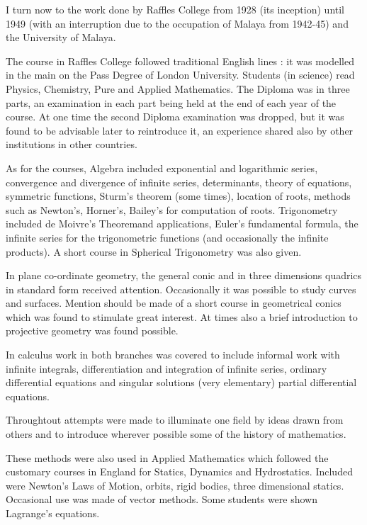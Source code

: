 I turn now to the work done by Raffles College from 1928 (its inception) until 1949 (with an interruption due to the occupation of Malaya from 1942-45) and the University of Malaya.

The course in Raffles College followed traditional English lines : it was modelled in the main on the Pass Degree of London University. Students (in science) read Physics, Chemistry, Pure and Applied Mathematics. The Diploma was in three parts, an examination in each part being held at the end of each year of the course. At one time the second Diploma examination was dropped, but it was found to be advisable later to reintroduce it, an experience shared also by other institutions in other countries.

As for the courses, Algebra included exponential and logarithmic series, convergence and divergence of infinite series, determinants, theory of equations, symmetric functions, Sturm's theorem (some times), location of roots, methods such as Newton's, Horner's, Bailey's for computation of roots. Trigonometry included de Moivre's Theorem\pageoriginale and applications, Euler's fundamental formula, the infinite series for the trigonometric functions (and occasionally the infinite products). A short course in Spherical Trigonometry was also given.

In plane co-ordinate geometry, the general conic and in three dimensions quadrics in standard form received attention. Occasionally it was possible to study curves and surfaces. Mention should be made of a short course in geometrical conics which was found to stimulate great interest. At times also a brief introduction to projective geometry was found possible.

In calculus work in both branches was covered to include informal work with infinite integrals, differentiation and integration of infinite series, ordinary differential equations and singular solutions (very elementary) partial differential equations.

Throughtout attempts were made to illuminate one field by ideas drawn from others and to introduce wherever possible some of the history of mathematics.

These methods were also used in Applied Mathematics which followed the customary courses in England for Statics, Dynamics and Hydrostatics. Included were Newton's Laws of Motion, orbits, rigid bodies, three dimensional statics. Occasional use was made of vector methods. Some students were shown Lagrange's equations.

